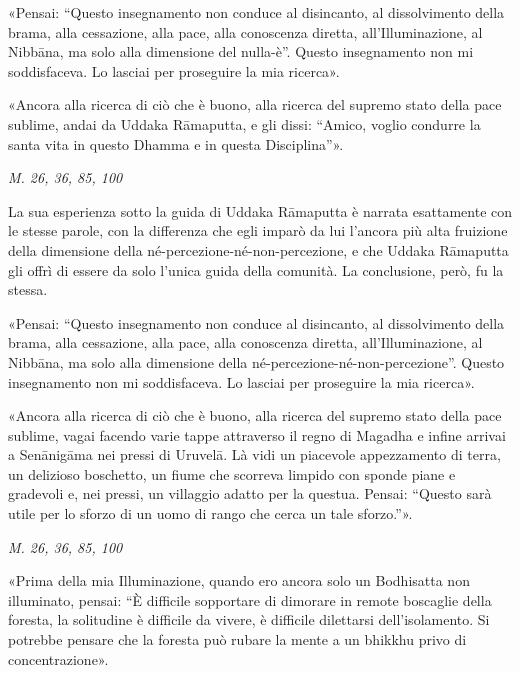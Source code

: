 «Pensai: “Questo insegnamento non conduce al disincanto, al
dissolvimento della brama, alla cessazione, alla pace, alla conoscenza
diretta, all’Illuminazione, al Nibbāna, ma solo alla dimensione del
nulla-è”. Questo insegnamento non mi soddisfaceva. Lo lasciai per
proseguire la mia ricerca».


«Ancora alla ricerca di ciò che è buono, alla ricerca del supremo stato
della pace sublime, andai da Uddaka Rāmaputta, e gli dissi: “Amico,
voglio condurre la santa vita in questo Dhamma e in questa Disciplina”».


\emph{M. 26, 36, 85, 100}


 La sua esperienza sotto la guida di Uddaka Rāmaputta è
narrata esattamente con le stesse parole, con la differenza che egli
imparò da lui l’ancora più alta fruizione della dimensione della
né-percezione-né-non-percezione, e che Uddaka Rāmaputta gli offrì di
essere da solo l’unica guida della comunità. La conclusione, però, fu la
stessa.


 «Pensai: “Questo insegnamento non conduce al disincanto, al
dissolvimento della brama, alla cessazione, alla pace, alla conoscenza
diretta, all’Illuminazione, al Nibbāna, ma solo alla dimensione della
né-percezione-né-non-percezione”. Questo insegnamento non mi
soddisfaceva. Lo lasciai per proseguire la mia ricerca».


«Ancora alla ricerca di ciò che è buono, alla ricerca del supremo stato
della pace sublime, vagai facendo varie tappe attraverso il regno di
Magadha e infine arrivai a Senānigāma nei pressi di Uruvelā. Là vidi un
piacevole appezzamento di terra, un delizioso boschetto, un fiume che
scorreva limpido con sponde piane e gradevoli e, nei pressi, un
villaggio adatto per la questua. Pensai: “Questo sarà utile per lo
sforzo di un uomo di rango che cerca un tale sforzo.”».


\emph{M. 26, 36, 85, 100}


«Prima della mia Illuminazione, quando ero ancora solo un Bodhisatta non
illuminato, pensai: “È difficile sopportare di dimorare in remote
boscaglie della foresta, la solitudine è difficile da vivere, è
difficile dilettarsi dell’isolamento. Si potrebbe pensare che la foresta
può rubare la mente a un bhikkhu privo di concentrazione».


